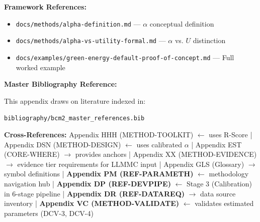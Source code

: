\textbf{Framework References:}
\begin{itemize}[nosep]
\item \texttt{docs/methods/alpha-definition.md} --- $\alpha$ conceptual definition
\item \texttt{docs/methods/alpha-vs-utility-formal.md} --- $\alpha$ vs. $U$ distinction
\item \texttt{docs/examples/green-energy-default-proof-of-concept.md} --- Full worked example
\end{itemize}

\textbf{Master Bibliography Reference:}

This appendix draws on literature indexed in:

\texttt{bibliography/bcm2\_master\_references.bib}

\nocite{bcm2_master}


\begin{tcolorbox}[colback=gray!5!white, colframe=gray!50!black]
\small
\textbf{Cross-References:}
Appendix HHH (METHOD-TOOLKIT) $\leftarrow$ uses R-Score |
Appendix DSN (METHOD-DESIGN) $\leftarrow$ uses calibrated $\alpha$ |
Appendix EST (CORE-WHERE) $\rightarrow$ provides anchors |
Appendix XX (METHOD-EVIDENCE) $\rightarrow$ evidence tier requirements for LLMMC input |
Appendix GLS (Glossary) $\rightarrow$ symbol definitions |
\textbf{Appendix PM (REF-PARAMETH)} $\leftarrow$ methodology navigation hub |
\textbf{Appendix DP (REF-DEVPIPE)} $\leftarrow$ Stage 3 (Calibration) in 6-stage pipeline |
\textbf{Appendix DR (REF-DATAREQ)} $\rightarrow$ data source inventory |
\textbf{Appendix VC (METHOD-VALIDATE)} $\leftarrow$ validates estimated parameters (DCV-3, DCV-4)
\end{tcolorbox}


